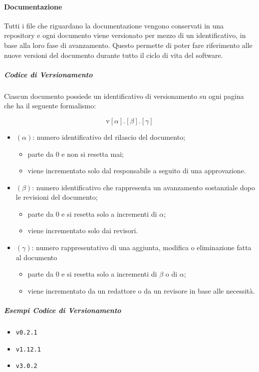 	\paragraph{Documentazione}

	Tutti i file che riguardano la documentazione vengono conservati in una repository e ogni documento viene versionato per mezzo di un identificativo, in base alla loro fase di avanzamento. Questo permette di poter fare riferimento alle nuove versioni del documento durante tutto il ciclo di vita del software.

		\subparagraph{Codice di Versionamento}

		Ciascun documento possiede un identificativo di versionamento su ogni pagina che ha il seguente formalismo:

		\[%
			\text{v}[\alpha].[\beta].[\gamma]
		\]

		\begin{itemize}
			\item \((\alpha)\): numero identificativo del rilascio del documento;
			\begin{itemize}
				\item parte da 0 e non si resetta mai;
				\item viene incrementato solo dal responsabile a seguito di una approvazione.
			\end{itemize}
			\item \((\beta)\): numero identificativo che rappresenta un avanzamento sostanziale dopo le revisioni del documento;
			\begin{itemize}
				\item parte da 0 e si resetta solo a incrementi di \(\alpha\);
				\item viene incrementato solo dai revisori.
			\end{itemize}
			\item \((\gamma)\): numero rappresentativo di una aggiunta, modifica o eliminazione fatta al documento
			\begin{itemize}
				\item parte da 0 e si resetta solo a incrementi di \(\beta\) o di \(\alpha\);
				\item viene incrementato da un redattore o da un revisore in base alle necessità. 
			\end{itemize}
		\end{itemize}

		\subparagraph{Esempi Codice di Versionamento} 
		
		\begin{itemize}
			\item \verb!v0.2.1!
			\item \verb!v1.12.1!
			\item \verb!v3.0.2!
		\end{itemize}

